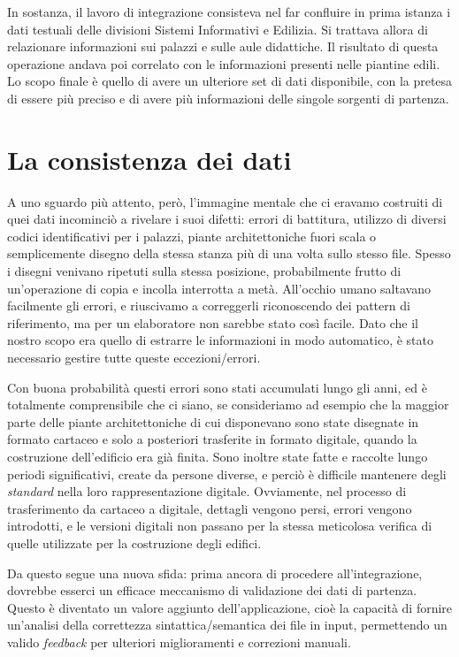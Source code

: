 \documentclass[12pt]{report}
\begin{document}
In sostanza, il lavoro di integrazione consisteva nel far confluire in
prima istanza i dati testuali delle divisioni Sistemi Informativi
e Edilizia. Si trattava allora di relazionare informazioni sui palazzi
e sulle aule didattiche. Il risultato di questa operazione andava 
poi correlato con le informazioni presenti nelle piantine edili. Lo scopo
finale è quello di avere un ulteriore set di dati disponibile, con la
pretesa di essere più preciso e di avere più informazioni delle
singole sorgenti di partenza.

\section{La consistenza dei dati}

A uno sguardo più attento, però, l'immagine mentale che ci eravamo
costruiti di quei dati incominciò a rivelare i suoi difetti: errori di battitura, 
utilizzo di diversi
codici identificativi per i palazzi, piante architettoniche fuori
scala o semplicemente disegno della stessa stanza più di una volta
sullo stesso file. Spesso i disegni venivano ripetuti sulla stessa
posizione, probabilmente frutto di un'operazione di copia e incolla
interrotta a metà. All'occhio umano saltavano facilmente gli errori, e
riuscivamo a correggerli riconoscendo dei pattern di riferimento, ma per un
elaboratore non sarebbe stato così facile. Dato che il nostro scopo era 
quello di estrarre le informazioni in modo automatico, 
è stato necessario gestire tutte queste eccezioni/errori.

Con buona probabilità questi errori sono stati accumulati lungo gli
anni, ed è totalmente comprensibile che ci siano, se  consideriamo ad
esempio che la maggior parte delle piante architettoniche di cui
disponevano sono state disegnate in formato cartaceo e solo a posteriori
trasferite in formato digitale, quando la costruzione dell'edificio era già
finita. %
Sono inoltre state fatte e raccolte lungo periodi significativi,
create da persone diverse, e perciò è difficile mantenere degli
\textit{standard} nella loro rappresentazione digitale. Ovviamente, nel
processo di trasferimento da cartaceo a digitale, dettagli vengono persi,
errori vengono introdotti, e le versioni digitali non passano per la stessa
meticolosa verifica di quelle utilizzate per la costruzione degli edifici. 

Da questo segue una nuova sfida: prima ancora di procedere all'integrazione,
dovrebbe esserci un efficace meccanismo di validazione dei dati di partenza.
Questo è diventato un valore aggiunto dell'applicazione, cioè la capacità di
fornire un'analisi della correttezza sintattica/semantica dei file in input, permettendo
un valido \textit{feedback} per ulteriori miglioramenti e correzioni manuali.
\end{document}
